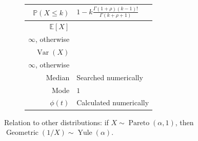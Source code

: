 \documentclass[a4paper,11pt]{article}
\theoremstyle{plain}
\theoremstyle{definition}
\newcommand{\ME}{\mathbb{E}}
\newcommand{\MP}{\mathbb{P}}
\newcommand{\Var}{\operatorname{Var}}
\begin{document}
\begin{figure}[!htb]
\begin{minipage}{0.4\textwidth}
\begin{tabular}{| r | l |}
				\hline
				$\MP(X \leq k)$ & $1-k \frac{ \Gamma(1+\rho) (k-1)! } {\Gamma(k+\rho+1)} $ \\
				\hline
				$\ME[X]$ & \pbox{\linewidth}{$ \frac{\rho}{\rho - 1}$, $\rho > 1$ \\ $\infty$, otherwise } \\
				\hline
				$\Var(X)$ & \pbox{\linewidth}{$ \frac{\rho^2}{(\rho - 1)^2(\rho-2)}$, $\rho > 2$ \\ $\infty$, otherwise } \\
				\hline
				Median & Searched numerically \\
				\hline
				Mode & $1 $ \\
				\hline
				$\phi(t)$ & Calculated numerically \\
				\hline
			\end{tabular}
		\end{minipage}
	\end{figure}
	Relation to other distributions: if $X \sim \operatorname{Pareto}(\alpha, 1)$, then $\operatorname{Geometric}(1/X) \sim \operatorname{Yule}(\alpha)$.
	
	\pagebreak
\end{document}
